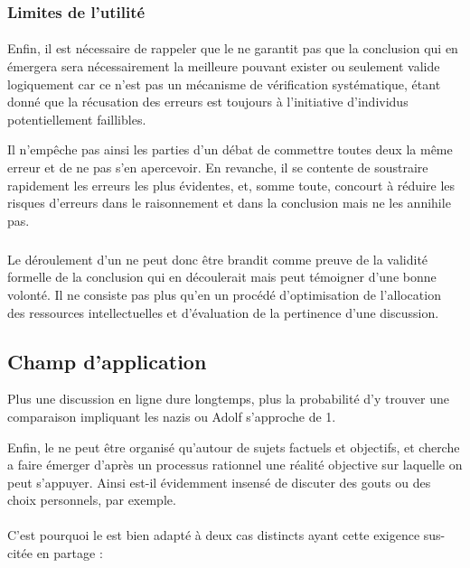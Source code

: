 \subsubsection{Limites de l’utilité}
\paragraph{}
Enfin, il est nécessaire de rappeler que le \mainabbr{} ne garantit pas que la conclusion qui en émergera sera nécessairement la meilleure pouvant exister ou seulement valide logiquement car ce n’est pas un mécanisme de vérification systématique, étant donné que la récusation des erreurs est toujours à l’initiative d’individus potentiellement faillibles.

Il n’empêche pas ainsi les parties d’un débat de commettre toutes deux la même erreur et de ne pas s’en apercevoir. En revanche, il se contente de soustraire rapidement les erreurs les plus évidentes, et, somme toute, concourt à réduire les risques d’erreurs dans le raisonnement et dans la conclusion mais ne les annihile pas.

\subparagraph{}
Le déroulement d’un \mainabbr{} ne peut donc être brandit comme preuve de la validité formelle de la conclusion qui en découlerait mais peut témoigner d’une bonne volonté. Il ne consiste pas plus qu’en un procédé d’optimisation de l’allocation des ressources intellectuelles et d’évaluation de la pertinence d’une discussion.

\subsection{Champ d’application}
\epigraph{Plus une discussion en ligne dure longtemps, plus la probabilité d’y trouver une comparaison impliquant les nazis ou Adolf  s’approche de 1.}{}
Enfin, le \mainabbr{} ne peut être organisé qu’autour de sujets factuels et objectifs, et cherche a faire émerger d’après un processus rationnel une réalité objective sur laquelle on peut s’appuyer. Ainsi est-il évidemment insensé de discuter des gouts ou des choix personnels, par exemple.

\paragraph*{}
C’est pourquoi le \mainabbr{} est bien adapté à deux cas distincts ayant cette exigence sus-citée en partage :

